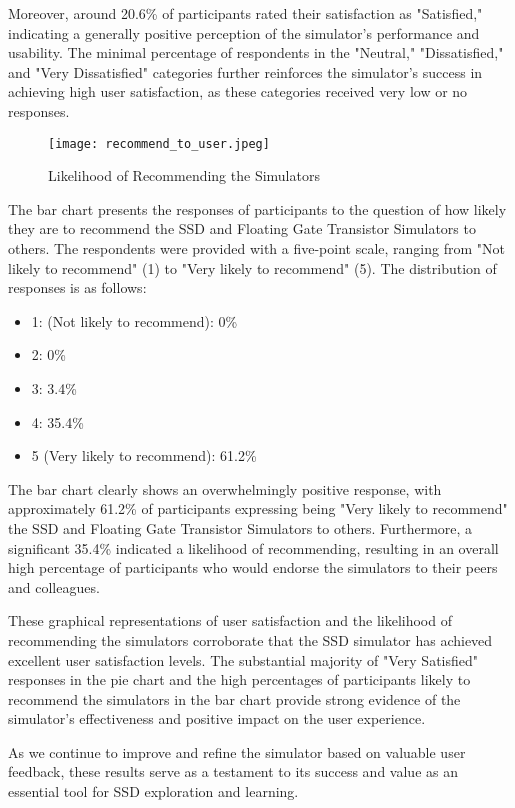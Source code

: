 \documentclass[conference]{/home/habib/Desktop/flash_ssd_simulator_web/paper_writing/latex_file/IEEEtran}
\begin{document}
Moreover, around 20.6\% of participants rated their satisfaction as "Satisfied," indicating a generally positive perception of the simulator's performance and usability. The minimal percentage of respondents in the "Neutral," "Dissatisfied," and "Very Dissatisfied" categories further reinforces the simulator's success in achieving high user satisfaction, as these categories received very low or no responses.
\begin{figure}[h]
    \centering
    \texttt{[image: recommend\_to\_user.jpeg]}
    \caption{Likelihood of Recommending the Simulators}
    \label{fig:enter-label}
\end{figure}
The bar chart presents the responses of participants to the question of how likely they are to recommend the SSD and Floating Gate Transistor Simulators to others. The respondents were provided with a five-point scale, ranging from "Not likely to recommend" (1) to "Very likely to recommend" (5). The distribution of responses is as follows:
\begin{itemize}
    \item 1: (Not likely to recommend): 0\%
    \item 2: 0\%
    \item 3: 3.4\%
    \item 4: 35.4\%
    \item 5 (Very likely to recommend): 61.2\%
\end{itemize}
The bar chart clearly shows an overwhelmingly positive response, with approximately 61.2\% of participants expressing being "Very likely to recommend" the SSD and Floating Gate Transistor Simulators to others. Furthermore, a significant 35.4\% indicated a likelihood of recommending, resulting in an overall high percentage of participants who would endorse the simulators to their peers and colleagues.

These graphical representations of user satisfaction and the likelihood of recommending the simulators corroborate that the SSD simulator has achieved excellent user satisfaction levels. The substantial majority of "Very Satisfied" responses in the pie chart and the high percentages of participants likely to recommend the simulators in the bar chart provide strong evidence of the simulator's effectiveness and positive impact on the user experience.

As we continue to improve and refine the simulator based on valuable user feedback, these results serve as a testament to its success and value as an essential tool for SSD exploration and learning.
\end{document}
